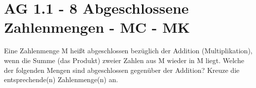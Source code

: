 \section{AG 1.1 - 8 Abgeschlossene Zahlenmengen - MC - MK}

\begin{beispiel}[AG 1.1]{1} %
				Eine Zahlenmenge M heißt abgeschlossen bezüglich der Addition (Multiplikation), wenn die Summe (das Produkt) zweier Zahlen aus M wieder in M liegt. Welche der folgenden Mengen sind abgeschlossen gegenüber der Addition? Kreuze die entsprechende(n) Zahlenmenge(n) an.\\

\end{beispiel}
